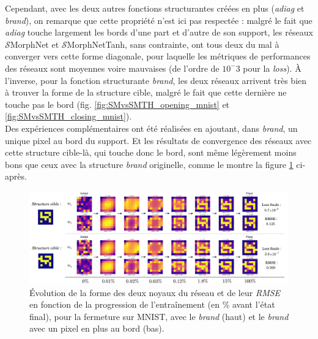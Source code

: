 \vspace{-1.0mm}
Cependant, avec les deux autres fonctions structurantes créées en plus (\textit{adiag} et \textit{brand}), on remarque que cette propriété n'est ici pas respectée : malgré le fait que \textit{adiag} touche largement les bords d'une part et d'autre de son support, les réseaux $\mathcal{S}$MorphNet et $\mathcal{S}$MorphNetTanh, sans contrainte, ont tous deux du mal à converger vers cette forme diagonale, pour laquelle les métriques de performances des réseaux sont moyennes voire mauvaises (de l'ordre de $10^-3$ pour la \textit{loss}). À l'inverse, pour la fonction structurante \textit{brand}, les deux réseaux arrivent très bien à trouver la forme de la structure cible, malgré le fait que cette dernière ne touche pas le bord (fig. \ref{fig:SMvsSMTH_opening_mnist} et \ref{fig:SMvsSMTH_closing_mnist}). \\

\vspace{-1.6mm}
\noindent Des expériences complémentaires ont été réalisées en ajoutant, dans \textit{brand}, un unique pixel au bord du support. Et les résultats de convergence des réseaux avec cette structure cible-là, qui touche donc le bord, sont même légèrement moins bons que ceux avec la structure \textit{brand} originelle, comme le montre la figure \ref{fig:touch_notouch_borders} ci-après.


\newpage

\begin{figure}[htp]
  \begin{center}
    \includegraphics[width=1.00\linewidth]{parts/4-analyse_des_reseaux/complexity_and_fails/figures/z_touchnotouch.pdf}
    \vspace{-4.0mm}
    \caption{ \centering Évolution de la forme des deux noyaux du réseau et de leur \textit{RMSE} en fonction de la progression de l'entraînement (en \% avant l'état final), pour la fermeture sur MNIST, avec le \textit{brand} (haut) et le \textit{brand} avec un pixel en plus au bord (bas).}
    \label{fig:touch_notouch_borders}
  \end{center}
\end{figure}

